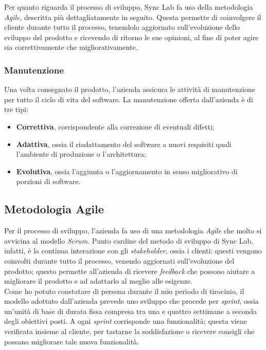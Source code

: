 Per quanto riguarda il processo di sviluppo, Sync Lab fa uso della metodologia \textit{Agile}, descritta più dettagliatamente in seguito. Questa permette di coinvolgere il cliente durante tutto il processo, tenendolo aggiornato sull'evoluzione dello sviluppo del prodotto e ricevendo di ritorno le sue opinioni, al fine di poter agire sia correttivamente che migliorativamente.

\subsubsection*{Manutenzione}

Una volta consegnato il prodotto, l'azienda assicura le attività di manutenzione per tutto il ciclo di vita del software. La manutenzione offerta dall'azienda è di tre tipi:
\begin{itemize}
  \item \textbf{Correttiva}, corrispondente alla correzione di eventuali difetti;
  \item \textbf{Adattiva}, ossia il riadattamento del software a nuovi requisiti quali l'ambiente di produzione o l'architettura;
  \item \textbf{Evolutiva}, ossia l'aggiunta o l'aggiornamento in senso migliorativo di porzioni di software.
\end{itemize}

\subsection{Metodologia Agile}

Per il processo di sviluppo, l'azienda fa uso di una metodologia \textit{Agile} che molto si avvicina al modello \textit{Scrum}. Punto cardine del metodo di sviluppo di Sync Lab, infatti, è la continua interazione con gli \textit{stakeholder}, ossia i clienti: questi vengono coinvolti durante tutto il processo, venendo aggiornati sull'evoluzione del prodotto; questo permette all'azienda di ricevere \textit{feedback} che possono aiutare a migliorare il prodotto e ad adattarlo al meglio alle esigenze. \\
Come ho potuto constatare di persona durante il mio periodo di tirocinio, il modello adottato dall'azienda prevede uno sviluppo che procede per \textit{sprint}, ossia un'unità di base di durata fissa compresa tra una e quattro settimane a seconda degli obiettivi posti. A ogni \textit{sprint} corrisponde una funzionalità; questa viene verificata insieme al cliente, per tastarne la soddisfazione o ricevere consigli che possano migliorare tale nuova funzionalità. \\

